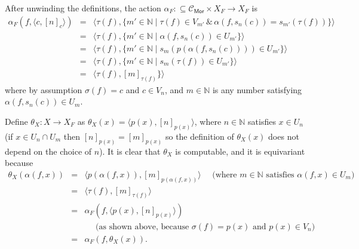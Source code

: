\documentclass[envcountsame]{llncs}
\def\IN{{\mathbb N}}
\def\calC{{\mathcal{C}}}
\newcommand{\Mor}{\mathsf{Mor}}
\def\src{{\sigma}}
\def\tar{{\tau}}
\begin{document}
After unwinding the definitions, the action $\alpha_F:\subseteq \calC_\Mor \times X_F \to X_F$ is
\begin{eqnarray*}
\alpha_F(f,\langle c, [n]_c \rangle) &=& \langle \tar(f), \{m'\in\IN \mid \tar(f)\in V_{m'} \,\&\, \alpha(f,s_n(c)) = s_{m'}(\tar(f))\} \rangle\\
&=&\langle \tar(f),\{m'\in\IN \mid \alpha(f,s_n(c)) \in U_{m'}\}\rangle\\
&=&\langle \tar(f),\{m'\in\IN \mid s_{m}(p(\alpha(f,s_n(c)))) \in U_{m'}\}\rangle\\
&=&\langle \tar(f),\{m'\in\IN \mid s_m(\tar(f)) \in U_{m'}\}\rangle\\
&=&\langle \tar(f),[m]_{\tar(f)}\}\rangle
\end{eqnarray*}
where by assumption $\src(f) = c$ and $c\in V_n$, and $m\in\IN$ is any number satisfying $\alpha(f,s_n(c)) \in U_m$.

Define $\theta_X\colon X \to X_F$ as $\theta_X(x) = \langle p(x), [n]_{p(x)} \rangle$, where $n\in \IN$ satisfies $x\in U_n$ (if $x \in U_n \cap U_m$ then $[n]_{p(x)} = [m]_{p(x)}$ so the definition of $\theta_X(x)$ does not depend on the choice of $n$). It is clear that $\theta_X$ is computable, and it is equivariant because
\begin{eqnarray*}
\theta_X(\alpha(f,x)) &=& \langle p(\alpha(f,x)), [m]_{p(\alpha(f,x))} \rangle\quad \text{ (where $m\in\IN$ satisfies $\alpha(f,x) \in U_m$)}\\
  &=& \langle \tau(f), [m]_{\tau(f)} \rangle\\
  &=& \alpha_F(f,\langle p(x), [n]_{p(x)} \rangle)\\
  && \quad \text{ (as shown above, because $\src(f)=p(x)$ and $p(x)\in V_n$)}\\
  &=& \alpha_F(f,\theta_X(x)).
\end{eqnarray*}
\end{document}
